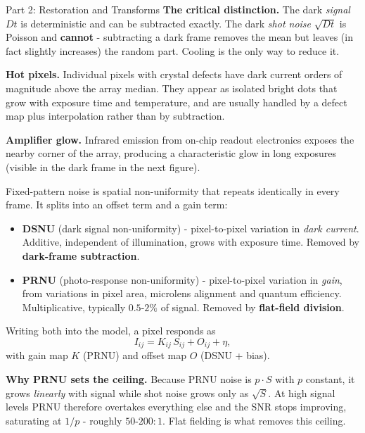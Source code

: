 \documentclass[letterpaper]{article}
\begin{document}
\begin{notes}{Part 2: Restoration and Transforms}
\textbf{The critical distinction.} The dark \emph{signal} $Dt$ is deterministic and can be subtracted exactly. The dark \emph{shot noise} $\sqrt{Dt}$ is Poisson and \textbf{cannot} - subtracting a dark frame removes the mean but leaves (in fact slightly increases) the random part. Cooling is the only way to reduce it.

\textbf{Hot pixels.} Individual pixels with crystal defects have dark current orders of magnitude above the array median. They appear as isolated bright dots that grow with exposure time and temperature, and are usually handled by a defect map plus interpolation rather than by subtraction.

\textbf{Amplifier glow.} Infrared emission from on-chip readout electronics exposes the nearby corner of the array, producing a characteristic glow in long exposures (visible in the dark frame in the next figure).


Fixed-pattern noise is spatial non-uniformity that repeats identically in every frame. It splits into an offset term and a gain term:

\begin{itemize}
    \item \textbf{DSNU} (dark signal non-uniformity) - pixel-to-pixel variation in \emph{dark current}. Additive, independent of illumination, grows with exposure time. Removed by \textbf{dark-frame subtraction}.
    \item \textbf{PRNU} (photo-response non-uniformity) - pixel-to-pixel variation in \emph{gain}, from variations in pixel area, microlens alignment and quantum efficiency. Multiplicative, typically $0.5$-$2\%$ of signal. Removed by \textbf{flat-field division}.
\end{itemize}

Writing both into the model, a pixel responds as
$$I_{ij} = K_{ij}\,S_{ij} + O_{ij} + \eta,$$
with gain map $K$ (PRNU) and offset map $O$ (DSNU + bias).

\textbf{Why PRNU sets the ceiling.} Because PRNU noise is $p\cdot S$ with $p$ constant, it grows \emph{linearly} with signal while shot noise grows only as $\sqrt S$. At high signal levels PRNU therefore overtakes everything else and the SNR stops improving, saturating at $1/p$ - roughly $50$-$200{:}1$. Flat fielding is what removes this ceiling.



\end{notes}
\end{document}

